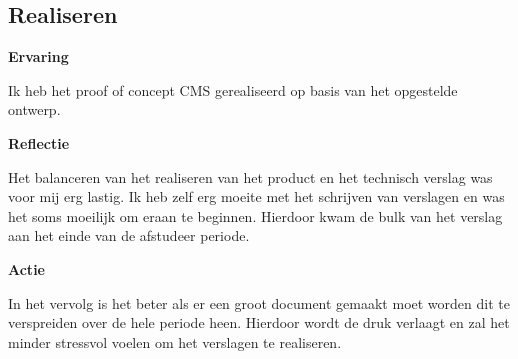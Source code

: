 \subsection{Realiseren}
\textbf{Ervaring}

\whitespace
Ik heb het proof of concept \gls{CMS} gerealiseerd op basis van het opgestelde ontwerp.

\whitespace
\textbf{Reflectie}

\whitespace
Het balanceren van het realiseren van het product en het technisch verslag was voor mij erg lastig.
Ik heb zelf erg moeite met het schrijven van verslagen en was het soms moeilijk om eraan te beginnen.
Hierdoor kwam de bulk van het verslag aan het einde van de afstudeer periode.

\whitespace
\textbf{Actie}

\whitespace
In het vervolg is het beter als er een groot document gemaakt moet worden dit te verspreiden over de hele periode heen.
Hierdoor wordt de druk verlaagt en zal het minder stressvol voelen om het verslagen te realiseren.
